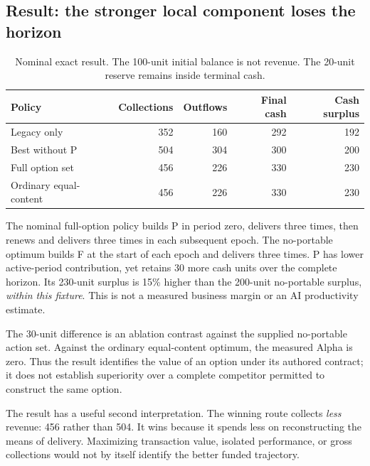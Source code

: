 \subsection{Result: the stronger local component loses the horizon}
\begin{table}[htbp]
\centering
\caption{Nominal exact result. The 100-unit initial balance is not revenue. The 20-unit reserve remains inside terminal cash.}
\begin{tabular}{@{}lrrrr@{}}
\toprule
Policy & Collections & Outflows & Final cash & Cash surplus\\
\midrule
Legacy only & 352 & 160 & 292 & 192\\
Best without P & 504 & 304 & 300 & 200\\
Full option set & 456 & 226 & 330 & 230\\
Ordinary equal-content & 456 & 226 & 330 & 230\\
\bottomrule
\end{tabular}
\end{table}

The nominal full-option policy builds P in period zero, delivers three times, then renews and delivers three times in each subsequent epoch. The no-portable optimum builds F at the start of each epoch and delivers three times. P has lower active-period contribution, yet retains 30 more cash units over the complete horizon. Its 230-unit surplus is 15\% higher than the 200-unit no-portable surplus, \emph{within this fixture}. This is not a measured business margin or an AI productivity estimate.

The 30-unit difference is an ablation contrast against the supplied no-portable action set. Against the ordinary equal-content optimum, the measured Alpha is zero. Thus the result identifies the value of an option under its authored contract; it does not establish superiority over a complete competitor permitted to construct the same option.

The result has a useful second interpretation. The winning route collects \emph{less} revenue: 456 rather than 504. It wins because it spends less on reconstructing the means of delivery. Maximizing transaction value, isolated performance, or gross collections would not by itself identify the better funded trajectory.

